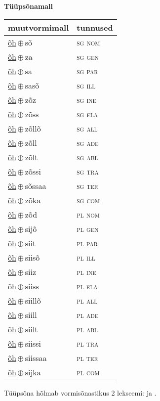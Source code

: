 

\vspace{3.5em}
\noindent \begin{minipage}{\textwidth}
\noindent \textbf{Tüüpsõnamall \,}\\

\begin{sideways}
\begin{tabular}{l l}
muutvormimall & tunnused \\
\hline
\underline{õh}\,$\oplus$\,sõ & \textsc{ sg nom } \\
\underline{õh}\,$\oplus$\,za & \textsc{ sg gen } \\
\underline{õh}\,$\oplus$\,sa & \textsc{ sg par } \\
\underline{õh}\,$\oplus$\,sasõ & \textsc{ sg ill } \\
\underline{õh}\,$\oplus$\,zõz & \textsc{ sg ine } \\
\underline{õh}\,$\oplus$\,zõss & \textsc{ sg ela } \\
\underline{õh}\,$\oplus$\,zõllõ & \textsc{ sg all } \\
\underline{õh}\,$\oplus$\,zõll & \textsc{ sg ade } \\
\underline{õh}\,$\oplus$\,zõlt & \textsc{ sg abl } \\
\underline{õh}\,$\oplus$\,zõssi & \textsc{ sg tra } \\
\underline{õh}\,$\oplus$\,sõssaa & \textsc{ sg ter } \\
\underline{õh}\,$\oplus$\,zõka & \textsc{ sg com } \\
\underline{õh}\,$\oplus$\,zõd & \textsc{ pl nom } \\
\underline{õh}\,$\oplus$\,sijõ & \textsc{ pl gen } \\
\underline{õh}\,$\oplus$\,siit & \textsc{ pl par } \\
\underline{õh}\,$\oplus$\,siisõ & \textsc{ pl ill } \\
\underline{õh}\,$\oplus$\,siiz & \textsc{ pl ine } \\
\underline{õh}\,$\oplus$\,siiss & \textsc{ pl ela } \\
\underline{õh}\,$\oplus$\,siillõ & \textsc{ pl all } \\
\underline{õh}\,$\oplus$\,siill & \textsc{ pl ade } \\
\underline{õh}\,$\oplus$\,siilt & \textsc{ pl abl } \\
\underline{õh}\,$\oplus$\,siissi & \textsc{ pl tra } \\
\underline{õh}\,$\oplus$\,siissaa & \textsc{ pl ter } \\
\underline{õh}\,$\oplus$\,sijka & \textsc{ pl com } \\
\end{tabular}
\end{sideways}
\label{tab:tüüpsõnamall-õhsõ}

\end{minipage}

 
\vspace{1em}
\noindent Tüüpsõna hõlmab vormisõnastikus 2 lekseemi:  ja .

